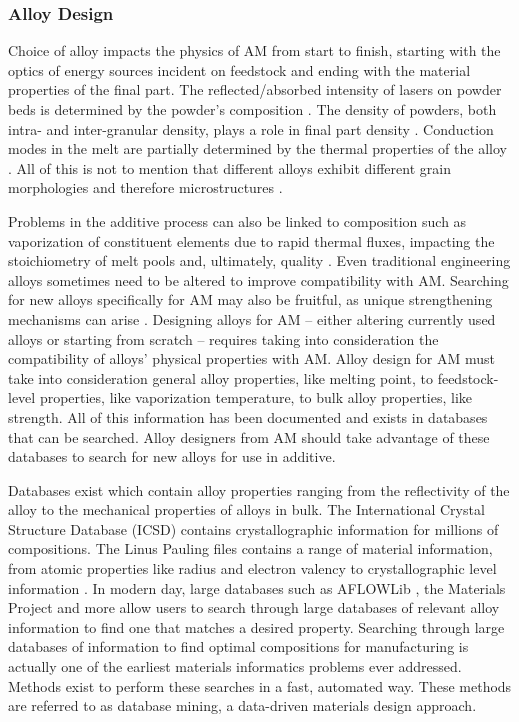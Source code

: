 \subsubsection{Alloy Design}
Choice of alloy impacts the physics of AM from start to finish, starting with the optics of energy sources incident on feedstock and ending with the material properties of the final part. The reflected/absorbed intensity of lasers on powder beds is determined by the powder's composition \cite{Boley2016, Trapp2017}. The density of powders, both intra- and inter-granular density, plays a role in final part density \cite{Bi2013}. Conduction modes in the melt are partially determined by the thermal properties of the alloy \cite{Martin2017}. All of this is not to mention that different alloys exhibit different grain morphologies and therefore microstructures \cite{Collins2016}. 

Problems in the additive process can also be linked to composition such as vaporization of constituent elements due to rapid thermal fluxes, impacting the stoichiometry of melt pools and, ultimately, quality \cite{Brice2018}. Even traditional engineering alloys sometimes need to be altered to improve compatibility with AM. Searching for new alloys specifically for AM may also be fruitful, as unique strengthening mechanisms can arise \cite{Brice2018, Wang2017}. Designing alloys for AM -- either altering currently used alloys or starting from scratch -- requires taking into consideration the compatibility of alloys' physical properties with AM. Alloy design for AM must take into consideration general alloy properties, like melting point, to feedstock-level properties, like vaporization temperature, to bulk alloy properties, like strength. All of this information has been documented and exists in databases that can be searched. Alloy designers from AM should take advantage of these databases to search for new alloys for use in additive. 

Databases exist which contain alloy properties ranging from the reflectivity of the alloy to the mechanical properties of alloys in bulk. The International Crystal Structure Database (ICSD) contains crystallographic information for millions of compositions. The Linus Pauling files contains a range of material information, from atomic properties like radius and electron valency to crystallographic level information \cite{Villars1998}. In modern day, large databases such as AFLOWLib \cite{Curtarolo2012a}, the Materials Project \cite{Jain2013} and more allow users to search through large databases of relevant alloy information to find one that matches a desired property. Searching through large databases of information to find optimal compositions for manufacturing is actually one of the earliest materials informatics problems ever addressed. Methods exist to perform these searches in a fast, automated way. These methods are referred to as database mining, a data-driven materials design approach.


